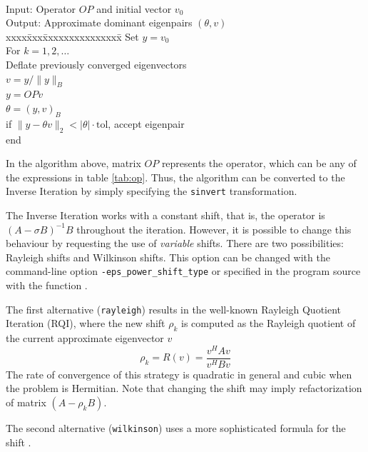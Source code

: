 \begin{algorithm}~\rm
\begin{tabbing}
Input: Operator $O\!P$ and initial vector $v_0$\\
Output: Approximate dominant eigenpairs $(\theta,v)$ \\
xxxx\=xxx\=xxxxxxxxxxxxxxx\=\kill
\> Set $y=v_0$\\
\> For $k=1,2,\ldots$\\
\> \> Deflate previously converged eigenvectors \\
\> \> $v=y/\|y\|_B$ \\
\> \> $y=O\!Pv$ \\
\> \> $\theta=(y,v)_B$ \\
\> \> if $\|y-\theta v\|_2 < |\theta| \cdot \mathrm{tol}$, accept eigenpair \\
\> end
\end{tabbing}
\end{algorithm}
In the algorithm above, matrix $O\!P$ represents the operator, which can be any of the expressions in table \ref{tab:op}. Thus, the algorithm can be converted to the Inverse Iteration by simply specifying the \texttt{sinvert} transformation.

The Inverse Iteration works with a constant shift, that is, the operator is $(A-\sigma B)^{-1}B$ throughout the iteration. However, it is possible to change this behaviour by requesting the use of \emph{variable} shifts. There are two possibilities: Rayleigh shifts and Wilkinson shifts. This option can be changed with the command-line option \Verb!-eps_power_shift_type! or specified in the program source with the function . 

The first alternative (\Verb!rayleigh!) results in the well-known Rayleigh Quotient Iteration (RQI), where the new shift $\rho_k$ is computed as the Rayleigh quotient of the current approximate eigenvector $v$
\begin{equation}
\rho_k=R(v)=\frac{v^H\!\!Av}{v^H\!Bv}
\end{equation}
The rate of convergence of this strategy is quadratic in general and cubic when the problem is Hermitian. Note that changing the shift may imply refactorization of matrix $(A-\rho_k B)$.

The second alternative (\Verb!wilkinson!) uses a more sophisticated formula for the shift \citep{Parlett:1998:SEP}.

\section{}

